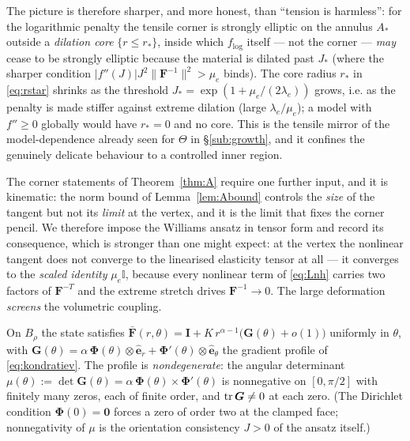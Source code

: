 \noindent The picture is therefore sharper, and more honest, than ``tension is harmless'': for the logarithmic penalty
the tensile corner is strongly elliptic on the annulus $A_*$ outside a \emph{dilation core} $\{r\le r_*\}$, inside which
$f_{\log}$ itself --- not the corner --- \emph{may} cease to be strongly elliptic because the material is dilated past
$J_*$ (where the sharper condition $|f''(J)|J^2\|\bm F^{-1}\|^2>\mu_e$ binds). The
core radius $r_*$ in \eqref{eq:rstar} shrinks as the threshold $J_*=\exp(1+\mu_e/(2\lambda_e))$ grows, i.e. as the
penalty is made stiffer against extreme dilation (large $\lambda_e/\mu_e$); a model with $f''\ge0$ globally would have
$r_*=0$ and no core. This is the tensile mirror of the model-dependence already seen for $\Theta$ in
\S\ref{sub:growth}, and it confines the genuinely delicate behaviour to a controlled inner region.

The corner statements of Theorem~\ref{thm:A} require one further input, and it is kinematic: the norm bound of
Lemma~\ref{lem:Abound} controls the \emph{size} of the tangent but not its \emph{limit} at the vertex, and it is the
limit that fixes the corner pencil. We therefore impose the Williams ansatz in tensor form and record its consequence,
which is stronger than one might expect: at the vertex the nonlinear tangent does not converge to the linearised
elasticity tensor at all --- it converges to the \emph{scaled identity} $\mu_e\mathbb{I}$, because every nonlinear term
of \eqref{eq:Lnh} carries two factors of $\bm{F}^{-T}$ and the extreme stretch drives $\bm{F}^{-1}\to0$. The large
deformation \emph{screens} the volumetric coupling.

\begin{assumption}
    \label{ass:williams}
    On $B_\rho$ the state satisfies
    $\bar{\bm{F}}(r,\theta)=\bm{I}+K\,r^{\alpha-1}\big(\bm{G}(\theta)+o(1)\big)$ uniformly in $\theta$, with
    $\bm{G}(\theta)=\alpha\,\bm{\Phi}(\theta)\otimes\hat{\bm{e}}_r+\bm{\Phi}'(\theta)\otimes\hat{\bm{e}}_\theta$ the
    gradient profile of \eqref{eq:kondratiev}. The profile is \emph{nondegenerate}: the angular determinant
    $\mu(\theta):=\det\bm{G}(\theta)=\alpha\,\bm{\Phi}(\theta)\!\times\!\bm{\Phi}'(\theta)$ is nonnegative on
    $[0,\pi/2]$ with finitely many zeros, each of finite order, and $\operatorname{tr}\bm{G}\neq0$ at each zero. (The Dirichlet
    condition $\bm{\Phi}(0)=\bm{0}$ forces a zero of order two at the clamped face; nonnegativity of $\mu$ is the
    orientation consistency $J>0$ of the ansatz itself.)
\end{assumption}

